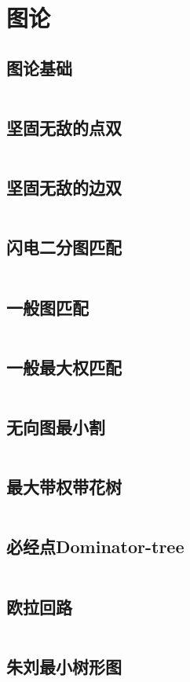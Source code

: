 \chapter{图论}
\section{图论基础}
\inputminted{cpp}{\source/graph-theory/basic.cpp}
\section{坚固无敌的点双}
\inputminted{cpp}{\source/graph-theory/biconnected-graph-vertex -jzh.cpp}
\section{坚固无敌的边双}
\inputminted{cpp}{\source/graph-theory/biconnected-graph-edge -jzh.cpp}
\section{闪电二分图匹配}
\inputminted{cpp}{\source/graph-theory/Hopcroft-Karp.cpp}
\section{一般图匹配}
\inputminted{cpp}{\source/graph-theory/general-matching.cpp}
\section{一般最大权匹配}
\inputminted{cpp}{\source/graph-theory/weighted_blossom.cpp}
\section{无向图最小割}
\inputminted{cpp}{\source/graph-theory/StoerWagner_O(V^3).cpp}
\section{最大带权带花树}
\inputminted{cpp}{\source/graph-theory/weighted_blossom.cpp}
\section{必经点Dominator-tree}
\inputminted{cpp}{\source/graph-theory/dominator.cpp}
\section{欧拉回路}
\inputminted{cpp}{\source/graph-theory/euler-tour.cpp}
\section{朱刘最小树形图}
\inputminted{cpp}{\source/graph-theory/minimum_arborescence.cpp}
